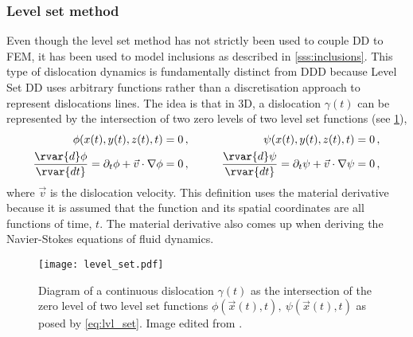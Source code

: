 \subsubsection{Level set method}
\label{sss:lvl_set}
%
Even though the level set method has not strictly been used to couple DD to FEM, it has been used to model inclusions \cite{ddd_inclusion_as_force} as described in \cref{sss:inclusions}. This type of dislocation dynamics is fundamentally distinct from DDD because Level Set DD uses arbitrary functions rather than a discretisation approach to represent dislocations lines. The idea is that in 3D, a dislocation $ \gamma(t) $ can be represented by the intersection of two zero levels of two level set functions (see \cref{f:lvl_set_dd}),
\begin{subequations}\label{eq:lvl_set}
    \begin{align}
        \phi(x(t),y(t),z(t),t)                                                          & = 0\,, & \qquad
        \psi(x(t),y(t),z(t),t)                                                          & = 0\,,          \\
        \dfrac{\rvar{d} \phi}{\rvar{dt}} = \partial_{t}\phi + \vec{v} \cdot \nabla \phi & = 0\,, & \qquad
        \dfrac{\rvar{d} \psi}{\rvar{dt}} = \partial_{t}\psi + \vec{v} \cdot \nabla \psi & = 0\,,
    \end{align}
\end{subequations}
where $ \vec{v} $ is the dislocation velocity. This definition uses the material derivative because it is assumed that the function and its spatial coordinates are all functions of time, $ t $. The material derivative also comes up when deriving the Navier-Stokes equations of fluid dynamics.
\begin{figure}[t]
    \centering
    \texttt{[image: level\_set.pdf]}
    \caption[Level set Dislocation Dynamics.]{Diagram of a continuous dislocation $ \gamma(t) $ as the intersection of the zero level of two level set functions $ \phi(\vec{x}(t),t),~\psi(\vec{x}(t),t) $ as posed by \cref{eq:lvl_set}. Image edited from \cite{lvl_set_dd}.}
    \label{f:lvl_set_dd}
\end{figure}

